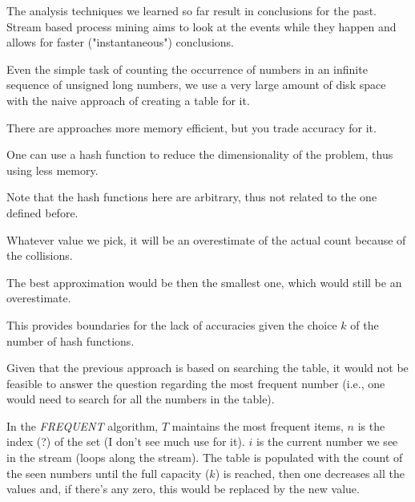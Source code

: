
\renewcommand\slidesfile{presentations/lecture_12_streaming_data.pdf}

\nextslides[slide=5,until=6,highlight=6]

The analysis techniques we learned so far result in conclusions for the past. Stream based process mining aims to look at the events while they happen and allows for faster ("instantaneous") conclusions.

\nextslides[slide=8,until=24,highlight=18]

Even the simple task of counting the occurrence of numbers in an infinite sequence of unsigned long numbers, we use a very large amount of disk space with the naive approach of creating a table for it.

There are approaches more memory efficient, but you trade accuracy for it.

\nextslides[until=27, highlight=27]

One can use a hash function to reduce the dimensionality of the problem, thus using less memory.

\nextslides[until=43,highlight=40]

Note that the hash functions here are arbitrary, thus not related to the one defined before.

Whatever value we pick, it will be an overestimate of the actual count because of the collisions.

\nextslides[until=46,highlight=46]

The best approximation would be then the smallest one, which would still be an overestimate.

\nextslides[slide=48]

This provides boundaries for the lack of accuracies given the choice $k$ of the number of hash functions.

\nextslides[until=59,highlight=50]

Given that the previous approach is based on searching the table, it would not be feasible to answer the question regarding the most frequent number (i.e., one would need to search for all the numbers in the table).

In the \emph{FREQUENT} algorithm, $T$ maintains the most frequent items, $n$ is the index (?) of the set (I don't see much use for it). $i$ is the current number we see in the stream (loops along the stream). The table is populated with the count of the seen numbers until the full capacity ($k$) is reached, then one decreases all the values and, if there's any zero, this would be replaced by the new value.

